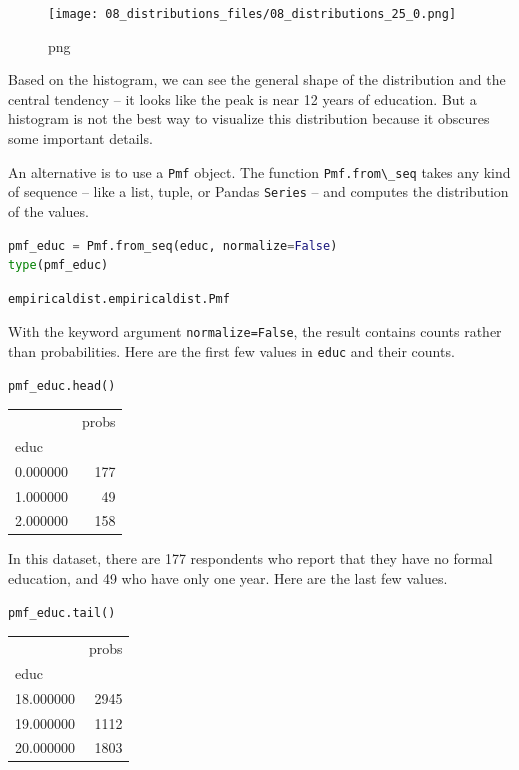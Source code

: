 \documentclass[
]{book}
\newcommand{\passthrough}[1]{#1}
\begin{document}
\begin{figure}
\centering
\texttt{[image: 08\_distributions\_files/08\_distributions\_25\_0.png]}
\caption{png}
\end{figure}

Based on the histogram, we can see the general shape of the distribution
and the central tendency -- it looks like the peak is near 12 years of
education. But a histogram is not the best way to visualize this
distribution because it obscures some important details.

An alternative is to use a \passthrough{\lstinline!Pmf!} object. The
function \passthrough{\lstinline!Pmf.from\_seq!} takes any kind of
sequence -- like a list, tuple, or Pandas
\passthrough{\lstinline!Series!} -- and computes the distribution of the
values.

\begin{lstlisting}[language=Python]
pmf_educ = Pmf.from_seq(educ, normalize=False)
type(pmf_educ)
\end{lstlisting}

\begin{lstlisting}
empiricaldist.empiricaldist.Pmf
\end{lstlisting}

With the keyword argument \passthrough{\lstinline!normalize=False!}, the
result contains counts rather than probabilities. Here are the first few
values in \passthrough{\lstinline!educ!} and their counts.

\begin{lstlisting}[language=Python]
pmf_educ.head()
\end{lstlisting}

\begin{tabular}{lr}
\toprule
 & probs \\
educ &  \\
\midrule
0.000000 & 177 \\
1.000000 & 49 \\
2.000000 & 158 \\
\bottomrule
\end{tabular}

In this dataset, there are 177 respondents who report that they have no
formal education, and 49 who have only one year. Here are the last few
values.

\begin{lstlisting}[language=Python]
pmf_educ.tail()
\end{lstlisting}

\begin{tabular}{lr}
\toprule
 & probs \\
educ &  \\
\midrule
18.000000 & 2945 \\
19.000000 & 1112 \\
20.000000 & 1803 \\
\bottomrule
\end{tabular}
\end{document}
